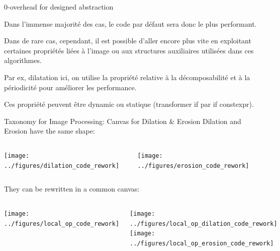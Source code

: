\documentclass[12pt,aspectratio=169]{beamer}
\begin{document}
\begin{frame}[fragile]{0-overhead for designed abstraction}
{    Dans l'immense majorité des cas, le code par défaut sera donc le plus performant.
    
    Dans de rare cas, cependant, il est possible d'aller encore plus vite en exploitant certaines propriétés liées à l'image ou aux structures auxiliaires utilisées dans ces algorithmes.
    
    Par ex, dilatation ici, on utilise la propriété relative à la décomposabilité et à la périodicité pour améliorer les performance.
    
    Ces propriété peuvent être dynamic ou statique (transformer if par if constexpr).
  }
\end{frame}

\begin{frame}[fragile]{Taxonomy for Image Processing: Canvas for Dilation \& Erosion}
  Dilation and Erosion have the same shape:
  \begin{columns}[T,onlytextwidth]
    \texttt{[image: ../figures/dilation\_code\_rework]}
    
    \texttt{[image: ../figures/erosion\_code\_rework]}
  \end{columns}
  \bigskip
  They can be rewritten in a common canvas:
  \begin{columns}[T,onlytextwidth]
    \texttt{[image: ../figures/local\_op\_code\_rework]}
    
    \texttt{[image: ../figures/local\_op\_dilation\_code\_rework]}
    \texttt{[image: ../figures/local\_op\_erosion\_code\_rework]}
  \end{columns}
  \pdfcomment[icon=Note]{   }
  \pdfcomment[icon=Note]{   }
  \pdfcomment[icon=Note]{   }
\end{frame}
\end{document}

